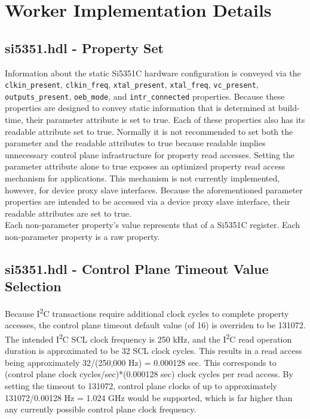 \documentclass{article}
\def\comp{temp}
\def\comp{si5351}
\begin{document}
\section*{Worker Implementation Details}
\subsection*{\comp.hdl - Property Set}
Information about the static Si5351C hardware configuration is conveyed via the \verb+clkin_present+, \verb+clkin_freq+, \verb+xtal_present+, \verb+xtal_freq+, \verb+vc_present+, \verb+outputs_present+, \verb+oeb_mode+, and \verb+intr_connected+ properties. Because these properties are designed to convey static information that is determined at build-time, their parameter attribute is set to true. Each of these properties also has its readable attribute set to true. Normally it is not recommended to set both the parameter and the readable attributes to true because readable implies unnecessary control plane infrastructure for property read accesses. Setting the parameter attribute alone to true exposes an optimized property read access mechanism for applications. This mechanism is not currently implemented, however, for device proxy slave interfaces. Because the aforementioned parameter properties are intended to be accessed via a device proxy slave interface, their readable attributes are set to true. \\

\noindent Each non-parameter property's value represents that of a Si5351C register. Each non-parameter property is a raw property. \\

\subsection*{\comp.hdl - Control Plane Timeout Value Selection}
\noindent Because I\textsuperscript{2}C transactions require additional clock cycles to complete property accesses, the control plane timeout default value (of 16) is overriden to be 131072. The intended I\textsuperscript{2}C SCL clock frequency is 250 kHz, and the I\textsuperscript{2}C read operation duration is approximated to be 32 SCL clock cycles. This results in a read access being approximately 32/(250,000 Hz) = 0.000128 sec. This corresponds to (control plane clock cycles/sec)*(0.000128 sec) clock cycles per read access. By setting the timeout to 131072, control plane clocks of up to approximately 131072/0.00128 Hz = 1.024 GHz would be supported, which is far higher than any currently possible control plane clock frequency.
\end{document}
